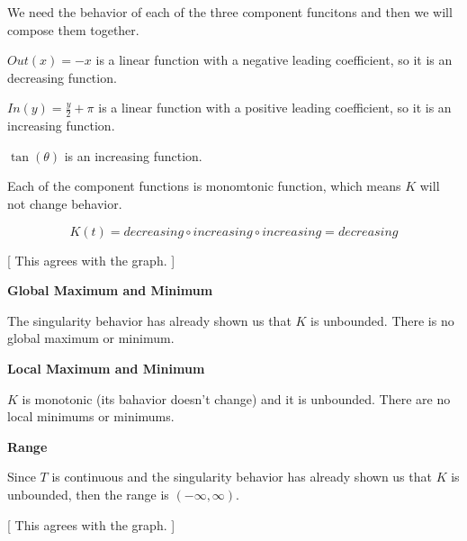 \documentclass{ximera}
\begin{document}
We need the behavior of each of the three component funcitons and then we will compose them together. 




$Out(x) = -x$ is a linear function with a negative leading coefficient, so it is an decreasing function.


$In(y) = \frac{y}{2} + \pi$ is a linear function with a positive leading coefficient, so it is an increasing function.


$\tan(\theta)$ is an increasing function.


Each of the component functions is monomtonic function, which means $K$ will not change behavior. 



\[
K(t) = decreasing \circ increasing \circ increasing = decreasing
\]




[ This agrees with the graph. ]












\textbf{\textcolor{blue!55!black}{Global Maximum and Minimum}}


The singularity behavior has already shown us that $K$ is unbounded. There is no global maximum or minimum.  














\textbf{\textcolor{blue!55!black}{Local Maximum and Minimum}}


$K$ is monotonic (its bahavior doesn't change) and it is unbounded.  There are no local minimums or minimums. 










\textbf{\textcolor{blue!55!black}{Range}}


Since $T$ is continuous and the singularity behavior has already shown us that $K$ is unbounded, then the range is $(-\infty, \infty)$. 



[ This agrees with the graph. ]
\end{document}
